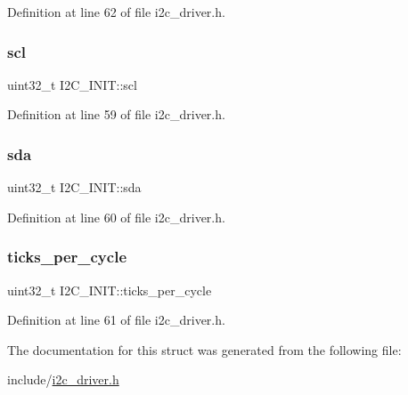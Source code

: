 Definition at line 62 of file i2c\+\_\+driver.\+h.

\mbox{\label{structI2C__INIT_a4eab84323108506ecf1f6e9cfbd9e8ee}} 
\subsubsection{\texorpdfstring{scl}{scl}}
{\footnotesize\ttfamily uint32\+\_\+t I2\+C\+\_\+\+I\+N\+I\+T\+::scl}



Definition at line 59 of file i2c\+\_\+driver.\+h.

\mbox{\label{structI2C__INIT_abf727e795643d048abf6948aab2af0cf}} 
\subsubsection{\texorpdfstring{sda}{sda}}
{\footnotesize\ttfamily uint32\+\_\+t I2\+C\+\_\+\+I\+N\+I\+T\+::sda}



Definition at line 60 of file i2c\+\_\+driver.\+h.

\mbox{\label{structI2C__INIT_a96ddefff7dcff1e60c8e51883b6dd106}} 
\subsubsection{\texorpdfstring{ticks\_per\_cycle}{ticks\_per\_cycle}}
{\footnotesize\ttfamily uint32\+\_\+t I2\+C\+\_\+\+I\+N\+I\+T\+::ticks\+\_\+per\+\_\+cycle}



Definition at line 61 of file i2c\+\_\+driver.\+h.



The documentation for this struct was generated from the following file\+:\begin{DoxyCompactItemize}
\item 
include/\mbox{\hyperlink{i2c__driver_8h}{i2c\+\_\+driver.\+h}}\end{DoxyCompactItemize}
